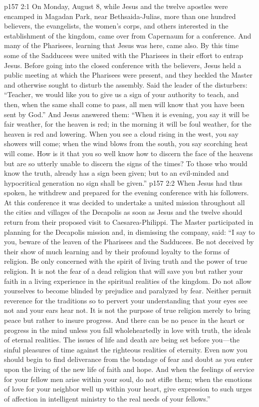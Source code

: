 \vs p157 2:1 On Monday, August 8, while Jesus and the twelve apostles were encamped in Magadan Park, near Bethsaida\hyp{}Julias, more than one hundred believers, the evangelists, the women’s corps, and others interested in the establishment of the kingdom, came over from Capernaum for a conference. And many of the Pharisees, learning that Jesus was here, came also. By this time some of the Sadducees were united with the Pharisees in their effort to entrap Jesus. Before going into the closed conference with the believers, Jesus held a public meeting at which the Pharisees were present, and they heckled the Master and otherwise sought to disturb the assembly. Said the leader of the disturbers: “Teacher, we would like you to give us a sign of your authority to teach, and then, when the same shall come to pass, all men will know that you have been sent by God.” And Jesus answered them: \textcolor{ubdarkred}{“When it is evening, you say it will be fair weather, for the heaven is red; in the morning it will be foul weather, for the heaven is red and lowering. When you see a cloud rising in the west, you say showers will come; when the wind blows from the south, you say scorching heat will come. How is it that you so well know how to discern the face of the heavens but are so utterly unable to discern the signs of the times? To those who would know the truth, already has a sign been given; but to an evil\hyp{}minded and hypocritical generation no sign shall be given.”}
\pc \vs p157 2:2 When Jesus had thus spoken, he withdrew and prepared for the evening conference with his followers. At this conference it was decided to undertake a united mission throughout all the cities and villages of the Decapolis as soon as Jesus and the twelve should return from their proposed visit to Caesarea\hyp{}Philippi. The Master participated in planning for the Decapolis mission and, in dismissing the company, said: \textcolor{ubdarkred}{“I say to you, beware of the leaven of the Pharisees and the Sadducees. Be not deceived by their show of much learning and by their profound loyalty to the forms of religion. Be only concerned with the spirit of living truth and the power of true religion. It is not the fear of a dead religion that will save you but rather your faith in a living experience in the spiritual realities of the kingdom. Do not allow yourselves to become blinded by prejudice and paralyzed by fear. Neither permit reverence for the traditions so to pervert your understanding that your eyes see not and your ears hear not. It is not the purpose of true religion merely to bring peace but rather to insure progress. And there can be no peace in the heart or progress in the mind unless you fall wholeheartedly in love with truth, the ideals of eternal realities. The issues of life and death are being set before you---the sinful pleasures of time against the righteous realities of eternity. Even now you should begin to find deliverance from the bondage of fear and doubt as you enter upon the living of the new life of faith and hope. And when the feelings of service for your fellow men arise within your soul, do not stifle them; when the emotions of love for your neighbor well up within your heart, give expression to such urges of affection in intelligent ministry to the real needs of your fellows.”}
